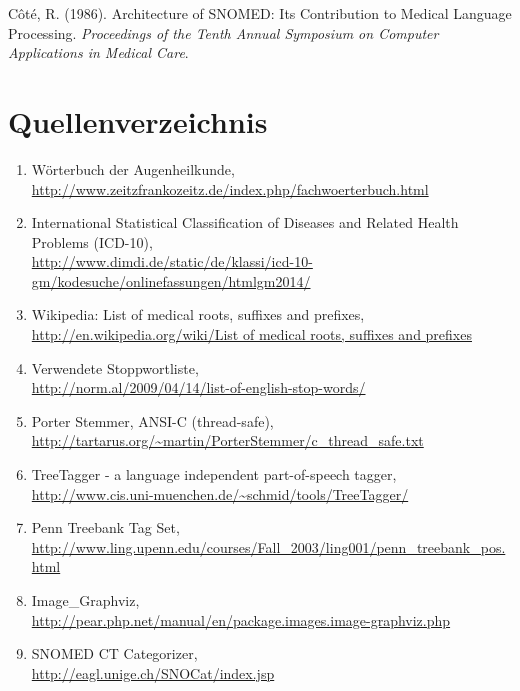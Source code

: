 \documentclass[pagesize,paper=A4,DIV=calc,fontsize=12pt,draft=false]{scrreprt}
\begin{document}
Côté, R. (1986). Architecture of SNOMED: Its Contribution to Medical Language Processing. \emph{Proceedings of the Tenth Annual Symposium on Computer Applications in Medical Care}.

\section{Quellenverzeichnis}

\begin{enumerate}
\item Wörterbuch der Augenheilkunde, \\
\href{http://www.zeitzfrankozeitz.de/index.php/fachwoerterbuch.html}{http://www.zeitzfrankozeitz.de/index.php/fachwoerterbuch.html}
\item International Statistical Classification of Diseases and Related Health Problems (ICD-10), \\
\href{http://www.dimdi.de/static/de/klassi/icd-10-gm/kodesuche/onlinefassungen/htmlgm2014/index.htm}{http://www.dimdi.de/static/de/klassi/icd-10-gm/kodesuche/onlinefassungen/htmlgm2014/}
\item Wikipedia: List of medical roots, suffixes and prefixes, \\
\href{http://en.wikipedia.org/wiki/List\_of\_medical\_roots,\_suffixes\_and\_prefixes}{http://en.wikipedia.org/wiki/List of medical roots, suffixes and prefixes}
\item Verwendete Stoppwortliste, \\ 
\href{http://norm.al/2009/04/14/list-of-english-stop-words/}{http://norm.al/2009/04/14/list-of-english-stop-words/}
\item Porter Stemmer, ANSI-C (thread-safe), \\
\href{http://tartarus.org/~martin/PorterStemmer/c_thread_safe.txt}{http://tartarus.org/\textasciitilde martin/PorterStemmer/c\_thread\_safe.txt}
\item TreeTagger - a language independent part-of-speech tagger, \\
\href{http://www.cis.uni-muenchen.de/~schmid/tools/TreeTagger/}{http://www.cis.uni-muenchen.de/\textasciitilde schmid/tools/TreeTagger/}
\item Penn Treebank Tag Set, \\
\href{http://www.ling.upenn.edu/courses/Fall_2003/ling001/penn_treebank_pos.html}{http://www.ling.upenn.edu/courses/Fall\_2003/ling001/penn\_treebank\_pos.html}
\item Image\_Graphviz, \\
\href{http://pear.php.net/manual/en/package.images.image-graphviz.php}{http://pear.php.net/manual/en/package.images.image-graphviz.php}
\item SNOMED CT Categorizer, \\
\href{http://eagl.unige.ch/SNOCat/index.jsp}{http://eagl.unige.ch/SNOCat/index.jsp}
\end{enumerate}
\end{document}
